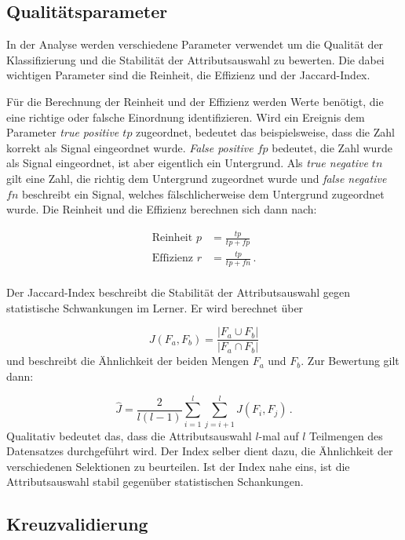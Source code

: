 \subsection{Qualitätsparameter}
In der Analyse werden verschiedene Parameter verwendet um die Qualität der Klassifizierung
und die Stabilität der Attributsauswahl zu bewerten. Die dabei wichtigen Parameter
sind die Reinheit, die Effizienz und der Jaccard-Index. \par
Für die Berechnung der Reinheit und der Effizienz werden Werte benötigt, die
eine richtige oder falsche Einordnung identifizieren. Wird ein Ereignis dem
Parameter \textit{true positive $tp$} zugeordnet, bedeutet das beispielsweise,
dass die Zahl korrekt als Signal eingeordnet wurde. \textit{False positive $fp$}
bedeutet, die Zahl wurde als Signal eingeordnet, ist aber eigentlich ein
Untergrund. Als \textit{true negative $tn$} gilt eine Zahl, die richtig dem Untergrund
zugeordnet wurde und \textit{false negative $fn$} beschreibt ein Signal, welches
fälschlicherweise dem Untergrund zugeordnet wurde. Die Reinheit und die Effizienz
berechnen sich dann nach:

\begin{align*}
    \text{Reinheit}\, \, p &= \frac{tp}{tp + fp} \\
    \text{Effizienz}\, \, r &= \frac{tp}{tp + fn} \, .\\
\end{align*}

Der Jaccard-Index beschreibt die Stabilität der Attributsauswahl gegen statistische
Schwankungen im Lerner. Er wird berechnet über

\begin{equation*}
    J \left(F_a, F_b \right) = \frac{|F_a \cup F_b|}{|F_a \cap F_b|}
\end{equation*}
und beschreibt die Ähnlichkeit der beiden Mengen $F_a$ und $F_b$. Zur Bewertung
gilt dann:

\begin{equation*}
    \hat{J} = \frac{2}{l \left(l - 1 \right)} \sum\limits_{i = 1}^{l}\sum\limits_{j = i+1}^{l} J\left(F_i, F_j \right) \, .
\end{equation*}
Qualitativ bedeutet das, dass die Attributsauswahl $l$-mal auf $l$ Teilmengen des Datensatzes durchgeführt wird. Der Index
selber dient dazu, die Ähnlichkeit der verschiedenen Selektionen zu beurteilen. Ist der Index nahe eins, ist die
Attributsauswahl stabil gegenüber statistischen Schankungen.

\subsection{Kreuzvalidierung}

